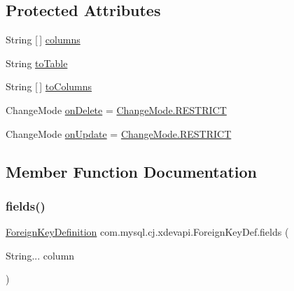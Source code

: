 \subsection*{Protected Attributes}
\begin{DoxyCompactItemize}
\item 
String \mbox{[}$\,$\mbox{]} \mbox{\hyperlink{classcom_1_1mysql_1_1cj_1_1xdevapi_1_1_foreign_key_def_a3ab686e302bc007e1e47bbabcbef2988}{columns}}
\item 
String \mbox{\hyperlink{classcom_1_1mysql_1_1cj_1_1xdevapi_1_1_foreign_key_def_a459c858f9a7dd86ebfc36a555049e4e8}{to\+Table}}
\item 
String \mbox{[}$\,$\mbox{]} \mbox{\hyperlink{classcom_1_1mysql_1_1cj_1_1xdevapi_1_1_foreign_key_def_a74864901200b11254bed38917d73e8d1}{to\+Columns}}
\item 
Change\+Mode \mbox{\hyperlink{classcom_1_1mysql_1_1cj_1_1xdevapi_1_1_foreign_key_def_acc7698fbffc9cfbc61a691f3100d6757}{on\+Delete}} = \mbox{\hyperlink{enumcom_1_1mysql_1_1cj_1_1xdevapi_1_1_foreign_key_definition_1_1_change_mode_a652113557f37d85e0f6ad8c4c83bf864}{Change\+Mode.\+R\+E\+S\+T\+R\+I\+CT}}
\item 
Change\+Mode \mbox{\hyperlink{classcom_1_1mysql_1_1cj_1_1xdevapi_1_1_foreign_key_def_ac67670317db85f5a276b7ca8502ccfaf}{on\+Update}} = \mbox{\hyperlink{enumcom_1_1mysql_1_1cj_1_1xdevapi_1_1_foreign_key_definition_1_1_change_mode_a652113557f37d85e0f6ad8c4c83bf864}{Change\+Mode.\+R\+E\+S\+T\+R\+I\+CT}}
\end{DoxyCompactItemize}


\subsection{Member Function Documentation}
\mbox{\label{classcom_1_1mysql_1_1cj_1_1xdevapi_1_1_foreign_key_def_acc462cbe87a4a3c4b53244d86a258070}} 
\subsubsection{\texorpdfstring{fields()}{fields()}}
{\footnotesize\ttfamily \mbox{\hyperlink{interfacecom_1_1mysql_1_1cj_1_1xdevapi_1_1_foreign_key_definition}{Foreign\+Key\+Definition}} com.\+mysql.\+cj.\+xdevapi.\+Foreign\+Key\+Def.\+fields (\begin{DoxyParamCaption}\item[{String...}]{column }\end{DoxyParamCaption})}



